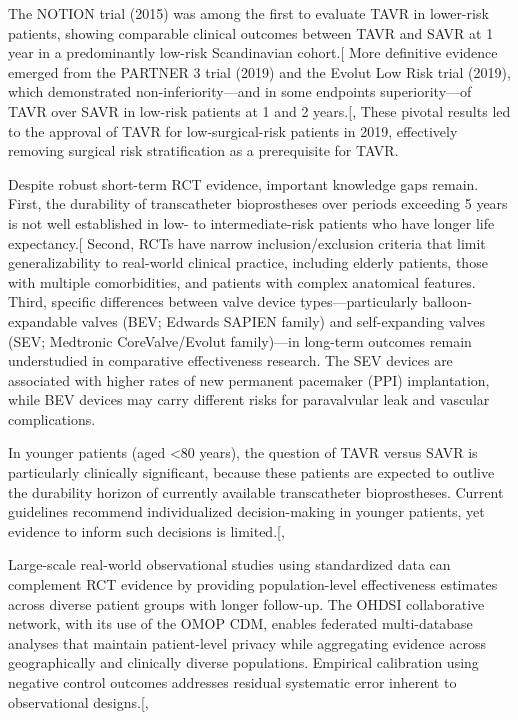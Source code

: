 \documentclass[
  12pt,
]{article}
\begin{document}
The NOTION trial (2015) was among the first to evaluate TAVR in
lower-risk patients, showing comparable clinical outcomes between TAVR
and SAVR at 1 year in a predominantly low-risk Scandinavian
cohort.{[}\citeproc{ref-Thyregod2015}{8}{]} More definitive evidence
emerged from the PARTNER 3 trial (2019) and the Evolut Low Risk trial
(2019), which demonstrated non-inferiority---and in some endpoints
superiority---of TAVR over SAVR in low-risk patients at 1 and 2
years.{[},\citeproc{ref-Popma2019}{10}{]}
These pivotal results led to the approval of TAVR for low-surgical-risk
patients in 2019, effectively removing surgical risk stratification as a
prerequisite for TAVR.

Despite robust short-term RCT evidence, important knowledge gaps remain.
First, the durability of transcatheter bioprostheses over periods
exceeding 5 years is not well established in low- to intermediate-risk
patients who have longer life
expectancy.{[}\citeproc{ref-Foroutan2016}{11}{]} Second, RCTs have
narrow inclusion/exclusion criteria that limit generalizability to
real-world clinical practice, including elderly patients, those with
multiple comorbidities, and patients with complex anatomical features.
Third, specific differences between valve device types---particularly
balloon-expandable valves (BEV; Edwards SAPIEN family) and
self-expanding valves (SEV; Medtronic CoreValve/Evolut family)---in
long-term outcomes remain understudied in comparative effectiveness
research. The SEV devices are associated with higher rates of new
permanent pacemaker (PPI) implantation, while BEV devices may carry
different risks for paravalvular leak and vascular complications.

In younger patients (aged \textless80 years), the question of TAVR
versus SAVR is particularly clinically significant, because these
patients are expected to outlive the durability horizon of currently
available transcatheter bioprostheses. Current guidelines recommend
individualized decision-making in younger patients, yet evidence to
inform such decisions is
limited.{[},\citeproc{ref-Otto2021}{13}{]}

Large-scale real-world observational studies using standardized data can
complement RCT evidence by providing population-level effectiveness
estimates across diverse patient groups with longer follow-up. The OHDSI
collaborative network, with its use of the OMOP CDM, enables federated
multi-database analyses that maintain patient-level privacy while
aggregating evidence across geographically and clinically diverse
populations. Empirical calibration using negative control outcomes
addresses residual systematic error inherent to observational
designs.{[},\citeproc{ref-Schuemie2018-zi}{15}{]}
\end{document}

